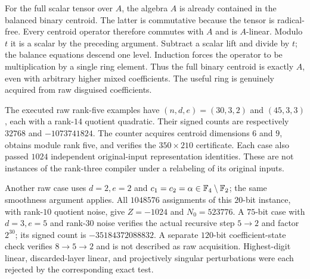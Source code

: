 For the full scalar tensor over $A$, the algebra $A$ is already contained
in the balanced binary centroid. The latter is commutative because the
tensor is radical-free. Every centroid operator therefore commutes with
$A$ and is $A$-linear. Modulo $t$ it is a scalar by the preceding argument.
Subtract a scalar lift and divide by $t$; the balance equations descend
one level. Induction forces the operator to be multiplication by a single
ring element. Thus the full binary centroid is exactly $A$, even with
arbitrary higher mixed coefficients. The useful ring is genuinely acquired
from raw disguised coefficients.

The executed raw rank-five examples have $(n,d,e)=(30,3,2)$ and
$(45,3,3)$, each with a rank-$14$ quotient quadratic. Their signed counts
are respectively $32768$ and $-1073741824$. The counter acquires centroid
dimensions $6$ and $9$, obtains module rank five, and verifies the
$350\times210$ certificate. Each case also passed $1024$ independent
original-input representation identities. These are not instances
of the rank-three compiler under a relabeling of its original inputs.

Another raw case uses $d=2,e=2$ and $c_1=c_2=\alpha\in\mathbb F_4\setminus\mathbb F_2$;
the same smoothness argument applies. All $1048576$ assignments of this
$20$-bit instance, with rank-$10$ quotient noise, give $Z=-1024$ and
$N_0=523776$. A $75$-bit case with $d=3,e=5$ and rank-$30$ noise
verifies the actual recursive step $5\to2$ and factor $2^{30}$; its
signed count is $-35184372088832$. A separate $120$-bit coefficient-state
check verifies $8\to5\to2$ and is not described as raw acquisition.
Highest-digit linear, discarded-layer linear, and projectively singular
perturbations were each rejected by the corresponding exact test.
